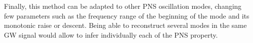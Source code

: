 Finally, this method can be adapted to other PNS oscillation modes, changing few parameters such as
the frequency range of the beginning of the mode and its monotonic raise or descent. Being able to
reconstruct several modes in the same GW signal would allow to infer individually each of the PNS property.


